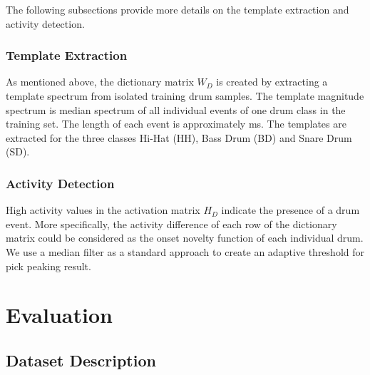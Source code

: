 \documentclass{article}
\begin{document}
The following subsections provide more details on the template extraction and activity detection. 


\subsubsection{Template Extraction}\label{subsubsec:template extraction}
As mentioned above, the dictionary matrix $W_D$ is created by extracting a template spectrum from isolated training drum samples. The template magnitude spectrum is median spectrum of all individual events of one drum class in the training set. The length of each event  is approximately \unit[80]{ms}. The templates are extracted for the three classes Hi-Hat (HH), Bass Drum (BD) and Snare Drum (SD).   

\subsubsection{Activity Detection}\label{subsubsec:activity detection}
High activity values in the activation matrix $H_D$ indicate the presence of a drum event. More specifically, the activity difference of each row of the dictionary matrix could be considered as the onset novelty function of each individual drum. We use a median filter as a standard approach to create an adaptive threshold for pick peaking result. 

\section{Evaluation}\label{sec:Evaluation}
\subsection{Dataset Description}\label{subsec:data set description}
\end{document}

